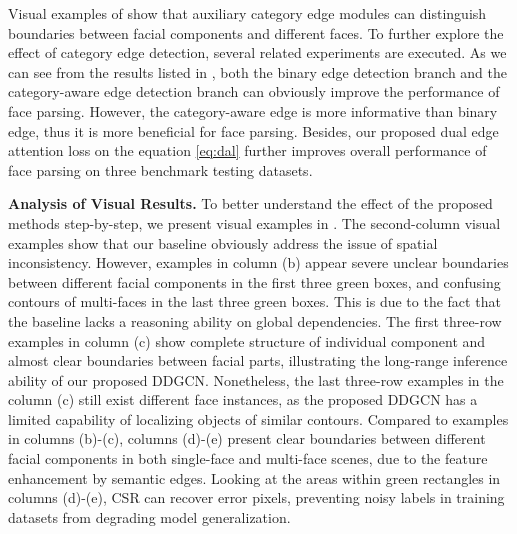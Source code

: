 \documentclass[10pt,twocolumn,letterpaper]{article}
\begin{document}
Visual examples of \figureautorefname{ \ref{fig:multiface}} show that auxiliary category edge modules can distinguish boundaries between facial components and different faces. To further explore the effect of category edge detection, several related experiments are executed.
As we can see from the results listed in \tableautorefname{ \ref{tab:multi_task}}, both the binary edge detection branch and the category-aware edge detection branch can obviously improve the performance of face parsing. However, the category-aware edge is more informative than binary edge, thus it is more beneficial for face parsing. Besides, our proposed dual edge attention loss on the equation \eqref{eq:dal} further improves overall performance of face parsing on three benchmark testing datasets.

\noindent\textbf{Analysis of Visual Results.} To better understand the effect of the proposed methods step-by-step, we present visual examples in \figureautorefname{ \ref{fig:visualization}}.
The second-column visual examples show that our baseline obviously address the issue of spatial inconsistency. However, examples in column (b) appear severe unclear boundaries between different facial components in the first three green boxes, and confusing contours of multi-faces in the last three green boxes. This is due to the fact that the baseline lacks a reasoning ability on global dependencies. 
The first three-row examples in column (c) show complete structure of individual component and almost clear boundaries between facial parts, illustrating the long-range inference ability of our proposed DDGCN. Nonetheless, the last three-row examples in the column (c) still exist different face instances, as the proposed DDGCN has a limited capability of localizing objects of similar contours. 
Compared to examples in columns (b)-(c), columns (d)-(e) present clear boundaries between different facial components in both single-face and multi-face scenes, due to the feature enhancement by semantic edges. 
Looking at the areas within green rectangles in columns (d)-(e), CSR can recover error pixels, preventing noisy labels in training datasets from degrading model generalization.
\end{document}
